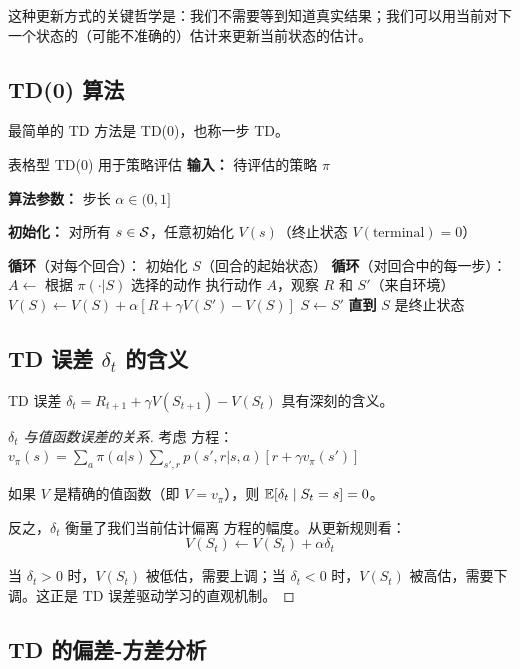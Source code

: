 这种更新方式的关键哲学是：我们不需要等到知道真实结果；我们可以用当前对下一个状态的（可能不准确的）估计来更新当前状态的估计。

\subsection{TD(0) 算法}

最简单的 TD 方法是 TD(0)，也称一步 TD。

\begin{myalgorithm}{表格型 TD(0) 用于策略评估}
\textbf{输入：} 待评估的策略 $\pi$

\textbf{算法参数：} 步长 $\alpha \in (0,1]$

\textbf{初始化：} 对所有 $s \in \mathcal{S}$，任意初始化 $V(s)$（终止状态 $V(\text{terminal}) = 0$）

\textbf{循环}（对每个回合）：
\quad 初始化 $S$（回合的起始状态）
\quad \textbf{循环}（对回合中的每一步）：
\quad \quad $A \leftarrow$ 根据 $\pi(\cdot|S)$ 选择的动作
\quad \quad 执行动作 $A$，观察 $R$ 和 $S'$（来自环境）
\quad \quad $V(S) \leftarrow V(S) + \alpha[R + \gamma V(S') - V(S)]$
\quad \quad $S \leftarrow S'$
\quad \textbf{直到} $S$ 是终止状态
\end{myalgorithm}

\subsection{TD 误差 $\delta_t$ 的含义}

TD 误差 $\delta_t = R_{t+1} + \gamma V(S_{t+1}) - V(S_t)$ 具有深刻的含义。

\begin{proof}[$\delta_t$ 与值函数误差的关系]
考虑 \bellman{} 方程：$v_{\pi}(s) = \sum_a \pi(a|s) \sum_{s', r} p(s', r|s,a)[r + \gamma v_{\pi}(s')]$

如果 $V$ 是精确的值函数（即 $V = v_{\pi}$），则 $\mathbb{E}[\delta_t \mid S_t = s] = 0$。

反之，$\delta_t$ 衡量了我们当前估计偏离 \bellman{} 方程的幅度。从更新规则看：
$$V(S_t) \leftarrow V(S_t) + \alpha \delta_t$$

当 $\delta_t > 0$ 时，$V(S_t)$ 被低估，需要上调；当 $\delta_t < 0$ 时，$V(S_t)$ 被高估，需要下调。这正是 TD 误差驱动学习的直观机制。
\end{proof}

\subsection{TD 的偏差-方差分析}

